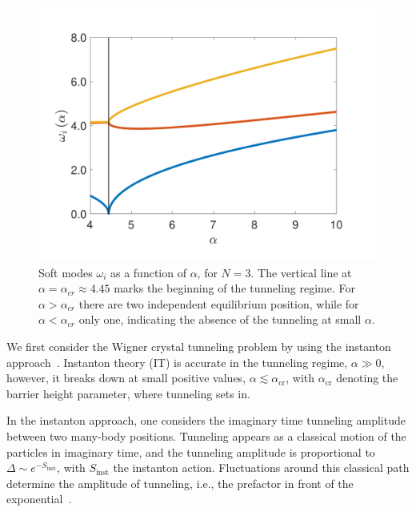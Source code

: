 \documentclass[aps, prb, floatfix, twocolumn, notitlepage, superscriptaddress, 10pt]{revtex4-2}
\newcommand{\1}{{1\hspace*{-0.5ex} \textrm{l} \hspace*{0.5ex}}}
\begin{document}
\begin{figure}[b!]
    \begin{center}
    	\includegraphics[width=0.9\columnwidth]{Fig_Freqs.pdf}		
     \caption{Soft modes $\omega_i$ as a function of $\alpha$, for $N=3$. The vertical line at $\alpha=\alpha_{cr} \approx 4.45$ marks the beginning of the tunneling regime. For $\alpha>\alpha_{cr}$ there are two independent equilibrium position, while for $\alpha<\alpha_{cr}$ only one, indicating the absence of the tunneling at small 
	 $\alpha$. }
     \label{fig:omega}
    \end{center}
\end{figure}  



We first consider the Wigner crystal tunneling problem by using the  instanton approach~\cite{Coleman.1988,Ciafaloni:1987qr, Grafke.2015,Richardson.2018,Milnikov.2001}.  Instanton theory  (IT)  is accurate  in 
the tunneling regime,  $\alpha\gg 0$,  however, it breaks down 
at small positive values, $\alpha\lesssim \alpha_\text{cr}$, with $\alpha_\text{cr}$ denoting the barrier height parameter, 
where tunneling sets in. 
 
 
 In the instanton approach, one considers the imaginary time  tunneling amplitude between two many-body  positions. 
  Tunneling appears as a classical motion of the 
 particles in imaginary time, and the tunneling amplitude is proportional to $\Delta \sim e^{-S_\text{inst}}$, with  $S_\text{inst}$
 the instanton action. Fluctuations around this classical path determine the amplitude of tunneling, i.e.,  the prefactor 
 in front of the exponential~\cite{Coleman.1988}. 
\end{document}
